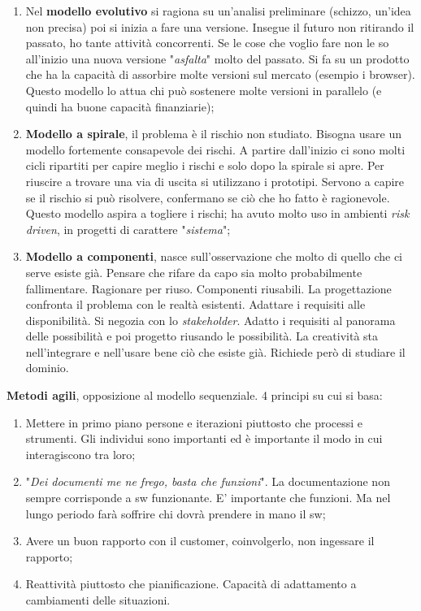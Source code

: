\begin{enumerate}
	\item Nel \textbf{modello evolutivo} si ragiona su un'analisi preliminare (schizzo, un'idea non precisa) poi si inizia a fare una versione. Insegue il futuro non ritirando il passato, ho tante attività concorrenti. Se le cose che voglio fare non le so all'inizio una nuova versione "\textit{asfalta}" molto del passato. Si fa su un prodotto che ha la capacità di assorbire molte versioni sul mercato (esempio i browser). Questo modello lo attua chi può sostenere molte versioni in parallelo (e quindi ha buone capacità finanziarie);
	
	\item \textbf{Modello a spirale}, il problema è il rischio non studiato. Bisogna usare un modello fortemente consapevole dei rischi. A partire dall'inizio ci sono molti cicli ripartiti per capire meglio i rischi e solo dopo la spirale si apre. Per riuscire a trovare una via di uscita si utilizzano i prototipi. Servono a capire se il rischio si può risolvere, confermano se ciò che ho fatto è ragionevole. Questo modello aspira a togliere i rischi; ha avuto molto uso in ambienti \textit{risk driven}, in progetti di carattere "\textit{sistema}";
	
	\item \textbf{Modello a componenti}, nasce sull'osservazione che molto di quello che ci serve esiste già. Pensare che rifare da capo sia molto probabilmente fallimentare. Ragionare per riuso. Componenti riusabili. La progettazione confronta il problema con le realtà esistenti. Adattare i requisiti alle disponibilità. Si negozia con lo \textit{stakeholder}. Adatto i requisiti al panorama delle possibilità e poi progetto riusando le possibilità. La creatività sta nell'integrare e nell'usare bene ciò che esiste già. Richiede però di studiare il dominio.

\end{enumerate}

\textbf{Metodi agili}, opposizione al modello sequenziale. 4 principi su cui si basa:

\begin{enumerate}

	\item Mettere in primo piano persone e iterazioni piuttosto che processi e strumenti. Gli individui sono importanti ed è importante il modo in cui interagiscono tra loro;
	
	\item "\textit{Dei documenti me ne frego, basta che funzioni}". La documentazione non sempre corrisponde a sw funzionante. E' importante che funzioni. Ma nel lungo periodo farà soffrire chi dovrà prendere in mano il sw;
	
	\item Avere un buon rapporto con il customer, coinvolgerlo, non ingessare il rapporto;
	
	\item Reattività piuttosto che pianificazione. Capacità di adattamento a cambiamenti delle situazioni.

\end{enumerate}

